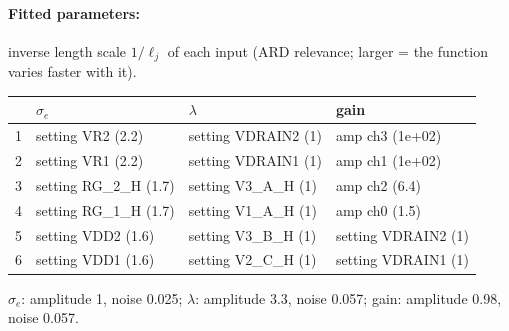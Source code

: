 \paragraph{Fitted parameters:} inverse length scale $1/\ell_j$ of each input (ARD relevance; larger = the function varies faster with it).
\begin{center}\footnotesize
\begin{tabular}{rp{}p{}p{}}
\toprule
 & $\sigma_e$ & $\lambda$ & gain \\
\midrule
1 & setting VR2 (2.2) & setting VDRAIN2 (1) & amp ch3 (1e+02) \\
2 & setting VR1 (2.2) & setting VDRAIN1 (1) & amp ch1 (1e+02) \\
3 & setting RG\_2\_H (1.7) & setting V3\_A\_H (1) & amp ch2 (6.4) \\
4 & setting RG\_1\_H (1.7) & setting V1\_A\_H (1) & amp ch0 (1.5) \\
5 & setting VDD2 (1.6) & setting V3\_B\_H (1) & setting VDRAIN2 (1) \\
6 & setting VDD1 (1.6) & setting V2\_C\_H (1) & setting VDRAIN1 (1) \\
\bottomrule
\end{tabular}
\end{center}
{\footnotesize $\sigma_e$: amplitude 1, noise 0.025; $\lambda$: amplitude 3.3, noise 0.057; gain: amplitude 0.98, noise 0.057.}
